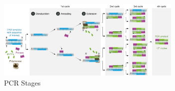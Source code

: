\documentclass[a4paper,conference]{IEEEtran}
\begin{document}
%
%
\begin{figure}[!t]
\centering
\includegraphics[width=3.5in]{pcr}
\caption{PCR Stages}
\label{fig_sim}
\end{figure}



%
%
\end{document}
